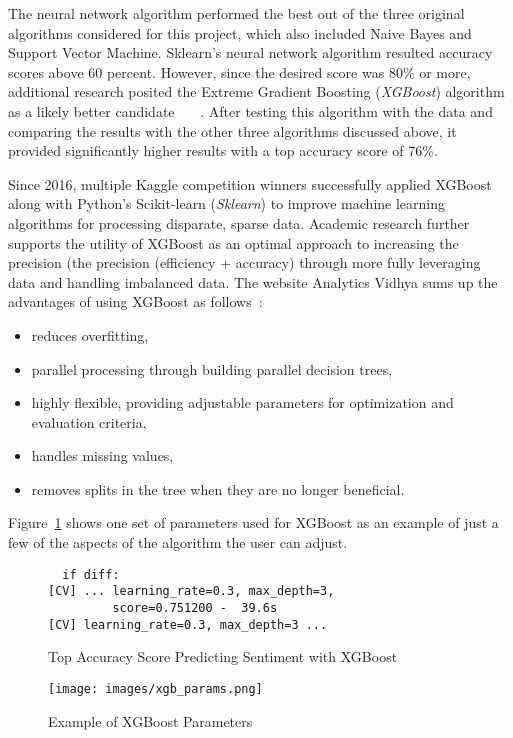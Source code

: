 The neural network algorithm performed the best out of the three original algorithms 
considered for this project, which also included Naive Bayes and Support Vector Machine.  
Sklearn's neural network algorithm resulted accuracy scores above 60 percent.  However, 
since the desired score was 80\% or more, additional research posited the Extreme 
Gradient Boosting (\emph{XGBoost}) algorithm as a likely better candidate~\cite{Chen2016}
~\cite{baba2016}~\cite{phunter2016}.  After testing this algorithm with the data and 
comparing the results with the other three algorithms discussed above, it provided 
significantly higher results with a top accuracy score of 76\%. 

Since 2016, multiple Kaggle competition winners successfully applied XGBoost 
along with Python’s Scikit-learn (\emph{Sklearn}) to improve
machine learning algorithms for processing disparate, sparse data.
Academic research further supports the utility of XGBoost as an optimal approach to
increasing the precision (the precision (efficiency + accuracy) through more fully
leveraging data and handling imbalanced data.  The website Analytics Vidhya sums up the
advantages of using XGBoost as follows~\cite{jain2016}:

\begin{itemize}
\item reduces overfitting,
\item parallel processing through building parallel decision trees,
\item highly flexible, providing adjustable parameters for optimization and evaluation criteria,
\item handles missing values,
\item removes splits in the tree when they are no longer beneficial. 
\end{itemize}

Figure~\ref{F:output} shows one set of parameters used for XGBoost as an example 
of just a few of the aspects of the algorithm the user can adjust. 

\begin{figure}[H]
\begin{verbatim}
  if diff:
[CV] ... learning_rate=0.3, max_depth=3, 
         score=0.751200 -  39.6s
[CV] learning_rate=0.3, max_depth=3 ...
\end{verbatim}
\caption{Top Accuracy Score Predicting Sentiment with XGBoost}\label{F:output}
\end{figure}

\begin{figure}[H]
\centering
\texttt{[image: images/xgb\_params.png]}
\caption{Example of XGBoost Parameters}
\label{fig:xgb_params}
\end{figure} 

